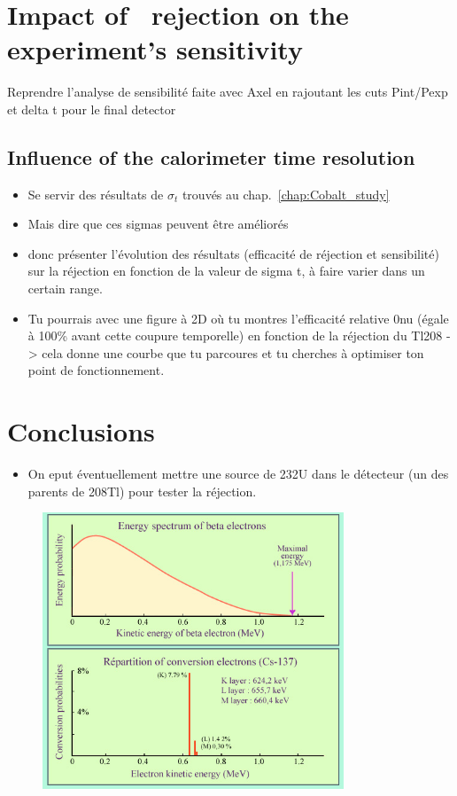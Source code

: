 \section{Impact of \Tl\ rejection on the experiment's sensitivity}
Reprendre l'analyse de sensibilité faite avec Axel en rajoutant les cuts Pint/Pexp et delta t pour le final detector

\subsection{Influence of the calorimeter time resolution}
\begin{itemize}
\item Se servir des résultats de $\sigma_{t}$ trouvés au chap.~\ref{chap:Cobalt_study}
\item Mais dire que ces sigmas peuvent être améliorés
\item donc présenter l'évolution des résultats (efficacité de réjection et sensibilité) sur la réjection en fonction de la valeur de sigma t, à faire varier dans un certain range.
\item Tu pourrais avec une figure à 2D où tu montres l'efficacité relative 0nu (égale à 100\% avant cette coupure temporelle) en fonction de la réjection du Tl208 -> cela donne une courbe que tu parcoures et tu cherches à optimiser ton point de fonctionnement.
\end{itemize}


\section{Conclusions}

\begin{itemize}
\item On eput éventuellement mettre une source de 232U dans le détecteur (un des parents de 208Tl) pour tester la réjection.
\end{itemize}


\begin{figure}
  \centering
  \includegraphics[width=9cm]{timedifference/fig_timediff/SpectreBeta_Cs137.jpg}
  \caption{\label{fig:Tl_IC}}

\end{figure}
